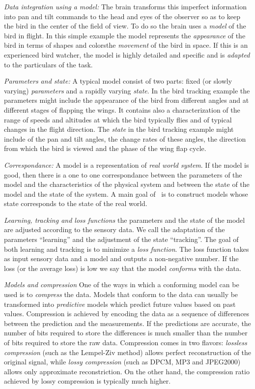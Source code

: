 \emph{Data integration using a model:} The brain transforms this
imperfect information into pan and tilt commands to the head and eyes
of the observer so as to keep the bird in the center of the field of
view. To do so the brain uses a {\em model} of the bird in flight. In
this simple example the model represents the {\em appearance} of the
bird in terms of shapes and colorsthe {\em movement} of the bird in
space. If this is an experienced bird watcher, the model is highly
detailed and specific and is {\em adapted} to the particulars of the
task.

\emph{Parameters and state:} A typical model consist of two parts:
fixed (or slowly varying) {\em parameters} and a rapidly varying {\em
  state}. In the bird tracking example the parameters might include
the appearance of the bird from different angles and at different
stages of flapping the wings. It contains also a characterization of
the range of speeds and altitudes at which the bird typically flies
and of typical changes in the flight direction.  The {\em state} in
the bird tracking example might include of the pan and tilt angles,
the change rates of these angles, the direction from which the bird is
viewed and the phase of the wing flap cycle.

\emph{Correspondance:} A model is a representation of {\em real world
  system}. If the model is good, then there is a one to one
correspondance between the parameters of the model and the
characteristics of the physical system and between the state of the
model and the state of the system. A main goal of \projName\ is to
construct models whose state corresponds to the state of the real world.

\emph{Learning, tracking and loss functions} the parameters and the
state of the model are adjusted according to the sensory data. We call
the adaptation of the parameters ``learning'' and the adjustment of
the state ``tracking''. The goal of both learning and tracking is to
minimize a {\em loss function}. The loss function takes as input
sensory data and a model and outputs a non-negative number. If the
loss (or the average loss) is low we say that the model {\em conforms}
with the data.


\emph{Models and compression} One of the ways in which a conforming
model can be used is to {\em compress} the data. Models that conform
to the data can usually be transformed into {\em predictive} models
which predict future values based on past values. Compression is
achieved by encoding the data as a sequence of differences between the
prediction and the measurements. If the predictions are accurate, the
number of bits required to store the differences is much smaller than
the number of bits required to store the raw data. Compression comes
in two flavors: {\em lossless compression} (such as the Lempel-Ziv method)
allows perfect reconstruction of the original signal, while {\em lossy
  compression} (such as DPCM, MP3 and JPEG2000) allows only
approximate reconstriction. On the other hand, the compression ratio
achieved by lossy compression is typically much higher.

